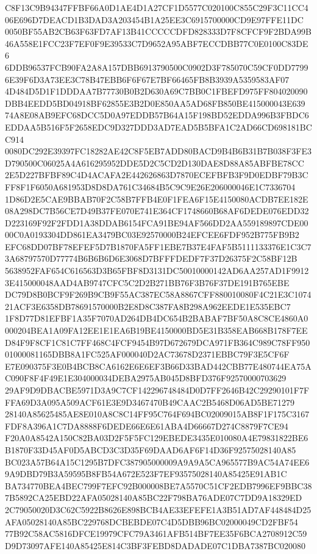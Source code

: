 \documentclass[UTF8,fontset=fandol,zihao=-4,a4paper]{ctexart}
\begin{document}
{{C8F13C9B94347FFBF66A0D1AE4D1A27CF1D5577C020100C855C29F3C11CC406E696D7DEACD1B3DAD3A203454B1A25EE3C6915700000CD9E97FFE11DC
0050BF55AB2CB63F63FD7AF13B41CCCCCDFD828333D7F8CFCF9F2BDA99B46A558E1FCC23F7EF0F9E39533C7D9652A95ABF7ECCDBB77C0E0100C83DE6
6DDB96537FCB90FA2A8A157DBB6913790500C0902D3F785070C59CF0DD77996E39F6D3A73EE3C78B47EBB6F6F67E7BF66465FB8B3939A5359583AF07
4D484D5D1F1DDDAA7B77730B0B2D630A69C7BB0C1FBEFD975FF804020090DBB4EEDD5BD04918BF62855E3B2D0E850AA5AD68FB850BE415000043E639
74A8E08AB9EFC68DCC5D0A97EDDB57B64A15F198BD52EDDA996B3FBDC6EDDAA5B516F5F2658EDC9D327DDD3AD7EAD5B5BFA1C2AD66CD698181BCC914
0080DC292E39397FC18282AE42C8F5EB7ADD80BACD9B4B6B31B7B038F3FE3D790500C06025A4A616295952DDE5D2C5CD2D130DAE8D88A85ABFBE78CC
2E5D227BFBF89C4D4ACAFA2E442626863D7870ECEFBFB3F9D0EDBF79B3CFF8F1F6050A681953D8D8DA761C34684B5C9C9E26E206000046E1C7336704
1D86D2E5CAE9BBAB70F2C58B7FFB4E0F1FEA6F15E4150080ACDB7EE182E08A298DC7B56CE7D49B37FE070E741E364CF1748660B68AF6DEDE076EDD32
D223169F92F2FDD1A38DDAB6154FCA91BE94AF566DD2AA559189897CDE0000C0A0193304DD861EA3479BC03E92570000B24EFCEE6FDF952B775FB9B2
EFC68DD07BF78EFEF5D7B1870FA5FF1EBE7B37E4FAF5B5111133376E1C3C73A68797570D77774B6B6B6D6E3068D7BFFFDEDF7F37D26375F2C58BF12B
5638952FAF654C616563D3B65FBF8D3131DC50010000142AD6AA257AD1F99123E415000048AAD4AB9747CFC5C2D2B271BB76F3B76F37DE191B765EBE
DC79D8B0BCF9F269B9CB9F55AC387EC58A8867CFF880010080F4C21E3C107421ACF3E6358DB78691570000B2E8D8C387FA8B298A962EEDE1E535EBC7
1F8D77D81EFBF1A35F7070AD264DB4DC654B2BABAF7BF50A8C8CE4860A0000204BEA1A09FA12EE1E1EA6B19BE4150000BD5E31B358EAB668B178F7EE
D84F9F8CF1C81C7FF468C4FCF9454B97D672679DCA971FB364C989C78FF95001000081165DBB8A1FC525AF000040D2AC73678D2371EBBC79F3E5CF6F
E7E090375F3E0B4BCB8CA6162E6E6EF3B66D33BAD442CBB77E480744EA75AC090F8F4F49E1E304000034DEBA2975AB045D8BFD376F92570000703629
29AF9D9DBACBE5971D3A9C7CF142296748484D0D7FF2646B42C29290101F7FFFA69D3A095A509ACF61E3E9D3467470B49CAAC2B5468D06AD5BE71279
28140A85625485AE8E010A8C8C14FF95C764F694BC02009015AB8F1F175C3167FDF8A396A1C7DA8888F6DEDE66E6E61ABA4D66667D274C8879F7CE94
F20A0A8542A150C82BA03D2F5F5FC129EBEDE3435E010080A4E79831822BE6B1870F33D45AF0D5ABCD3C3D35F69DAAD6AF6F14D36F92575028140A85
BC023A57B64A15C1295B7DFC387905000009A9A9A5CA965577B9AC54A74EE69A9DBD79B3A59595B8FB54A672E523F7EF93575028140A85425E91AB1C
BA734770BEA4BEC799F7EFC92B000008BE7A5570C51CF2EDB7996EF9BBC387B5892CA25EBD22AFA05028140A85BC22F798BA76ADE07C7DD9A18329ED
2C79050020D3C62C5922B8626E898BCB4AE33EFEFE1A3B51AD7AF448484D25AFA05028140A85BC229768DCBEBDE07C4D5DBB96BC02000049CD2FBF54
77B92C58AC5816DFCE19979CFC79A3461AFB514BF7EE35F6BCA2708912C59D9D73097AFE140A85425E814C3BF3FEBD8DADADE07C1DBA7387BC020080
}}
\end{document}
